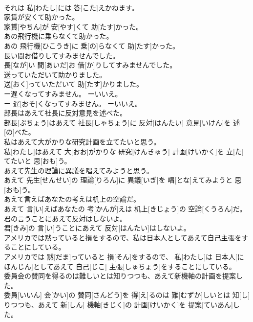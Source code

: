 \documentclass[8pt]{extreport}
\begin{document}
\begin{CJK}{UTF8}{min}
\\	それは 私[わたし]には 答[こた]えかねます。
\\	家賃が安くて助かった。	
\\	家賃[やちん]が 安[やす]くて 助[たす]かった。
\\	あの飛行機に乗らなくて助かった。	
\\	あの 飛行機[ひこうき]に 乗[の]らなくて 助[たす]かった。
\\	長い間お借りしてすみませんでした。	
\\	長[なが]い 間[あいだ]お 借[か]りしてすみませんでした。
\\	送っていただいて助かりました。	
\\	送[おく]っていただいて 助[たす]かりました。
\\	ー遅くなってすみません。 ーいいえ。	
\\	ー 遅[おそ]くなってすみません。 ーいいえ。
\\	部長はあえて社長に反対意見を述べた。	
\\	部長[ぶちょう]はあえて 社長[しゃちょう]に 反対[はんたい] 意見[いけん]を 述[の]べた。
\\	私はあえて大がかりな研究計画を立てたいと思う。	
\\	私[わたし]はあえて 大[おお]がかりな 研究[けんきゅう] 計画[けいかく]を 立[た]てたいと 思[おも]う。
\\	あえて先生の理論に異議を唱えてみようと思う。	
\\	あえて 先生[せんせい]の 理論[りろん]に 異議[いぎ]を 唱[とな]えてみようと 思[おも]う。
\\	あえて言えばあなたの考えは机上の空論だ。	
\\	あえて 言[い]えばあなたの 考[かんが]えは 机上[きじょう]の 空論[くうろん]だ。
\\	君の言うことにあえて反対はしないよ。	
\\	君[きみ]の 言[い]うことにあえて 反対[はんたい]はしないよ。
\\	アメリカでは黙っていると損をするので、私は日本人としてあえて自己主張をすることにしている。	
\\	アメリカでは 黙[だま]っていると 損[そん]をするので、 私[わたし]は 日本人[にほんじん]としてあえて 自己[じこ] 主張[しゅちょう]をすることにしている。
\\	委員会の賛同を得るのは難しいとは知りつつも、あえて新機軸の計画を提案した。	
\\	委員[いいん] 会[かい]の 賛同[さんどう]を 得[え]るのは 難[むずか]しいとは 知[し]りつつも、あえて 新[しん] 機軸[きじく]の 計画[けいかく]を 提案[ていあん]した。

\end{CJK}
\end{document}
